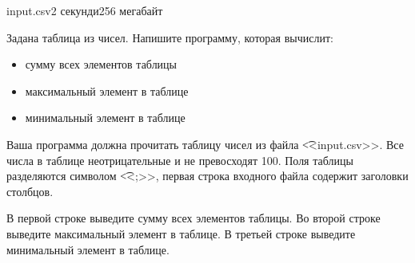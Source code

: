 \begin{problem}{}{input.csv}{}{2 секунди}{256 мегабайт}

Задана таблица из чисел. 
Напишите программу, которая вычислит:
\begin{itemize} 
\item сумму всех элементов таблицы
\item максимальный элемент в таблице
\item минимальный элемент в таблице
\end{itemize}

\InputFile
Ваша программа должна прочитать таблицу чисел из файла {\t {<<input.csv>>}}.
Все числа в таблице неотрицательные и не превосходят 100.
Поля таблицы разделяются символом {\t{<<;>>}}, первая строка входного файла содержит заголовки столбцов.

\OutputFile
В первой строке выведите сумму всех элементов таблицы.
Во второй строке выведите максимальный элемент в таблице.
В третьей строке выведите минимальный элемент в таблице.

\Example
\begin{example}
%
\end{example}

\end{problem}

